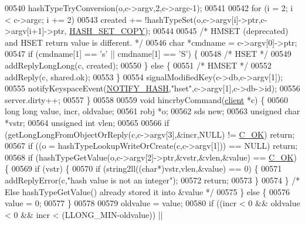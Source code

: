 \begin{DoxyCode}
00540     hashTypeTryConversion(o,c->argv,2,c->argc-1);
00541 
00542     \textcolor{keywordflow}{for} (i = 2; i < c->argc; i += 2)
00543         created += !hashTypeSet(o,c->argv[i]->ptr,c->argv[i+1]->ptr,
      \hyperlink{server_8h_ad182dd9d0a3945ad3fb4045e559b612e}{HASH\_SET\_COPY});
00544 
00545     \textcolor{comment}{/* HMSET (deprecated) and HSET return value is different. */}
00546     \textcolor{keywordtype}{char} *cmdname = c->argv[0]->ptr;
00547     \textcolor{keywordflow}{if} (cmdname[1] == \textcolor{stringliteral}{'s'} || cmdname[1] == \textcolor{stringliteral}{'S'}) \{
00548         \textcolor{comment}{/* HSET */}
00549         addReplyLongLong(c, created);
00550     \} \textcolor{keywordflow}{else} \{
00551         \textcolor{comment}{/* HMSET */}
00552         addReply(c, shared.ok);
00553     \}
00554     signalModifiedKey(c->db,c->argv[1]);
00555     notifyKeyspaceEvent(\hyperlink{server_8h_afe25ae13417e6fa5011e7efc69a34bc0}{NOTIFY\_HASH},\textcolor{stringliteral}{"hset"},c->argv[1],c->db->id);
00556     server.dirty++;
00557 \}
00558 
00559 \textcolor{keywordtype}{void} hincrbyCommand(\hyperlink{structclient}{client} *c) \{
00560     \textcolor{keywordtype}{long} \textcolor{keywordtype}{long} value, incr, oldvalue;
00561     robj *o;
00562     sds \textcolor{keyword}{new};
00563     \textcolor{keywordtype}{unsigned} \textcolor{keywordtype}{char} *vstr;
00564     \textcolor{keywordtype}{unsigned} \textcolor{keywordtype}{int} vlen;
00565 
00566     \textcolor{keywordflow}{if} (getLongLongFromObjectOrReply(c,c->argv[3],&incr,NULL) != \hyperlink{server_8h_a303769ef1065076e68731584e758d3e1}{C\_OK}) \textcolor{keywordflow}{return};
00567     \textcolor{keywordflow}{if} ((o = hashTypeLookupWriteOrCreate(c,c->argv[1])) == NULL) \textcolor{keywordflow}{return};
00568     \textcolor{keywordflow}{if} (hashTypeGetValue(o,c->argv[2]->ptr,&vstr,&vlen,&value) == \hyperlink{server_8h_a303769ef1065076e68731584e758d3e1}{C\_OK}) \{
00569         \textcolor{keywordflow}{if} (vstr) \{
00570             \textcolor{keywordflow}{if} (string2ll((\textcolor{keywordtype}{char}*)vstr,vlen,&value) == 0) \{
00571                 addReplyError(c,\textcolor{stringliteral}{"hash value is not an integer"});
00572                 \textcolor{keywordflow}{return};
00573             \}
00574         \} \textcolor{comment}{/* Else hashTypeGetValue() already stored it into &value */}
00575     \} \textcolor{keywordflow}{else} \{
00576         value = 0;
00577     \}
00578 
00579     oldvalue = value;
00580     \textcolor{keywordflow}{if} ((incr < 0 && oldvalue < 0 && incr < (LLONG\_MIN-oldvalue)) ||

\end{DoxyCode}
